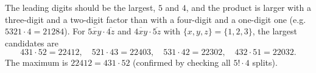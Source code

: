 The leading digits should be the largest, $5$ and $4$, and the product is larger with a three-digit and a two-digit factor than with a four-digit and a one-digit one (e.g. $5321\cdot4=21284$). For $\overline{5xy}\cdot\overline{4z}$ and $\overline{4xy}\cdot\overline{5z}$ with $\{x,y,z\}=\{1,2,3\}$, the largest candidates are
\[431\cdot52=22412,\quad 521\cdot43=22403,\quad 531\cdot42=22302,\quad 432\cdot51=22032.\]
The maximum is $\boxed{22412}=431\cdot52$ (confirmed by checking all $5!\cdot4$ splits).
